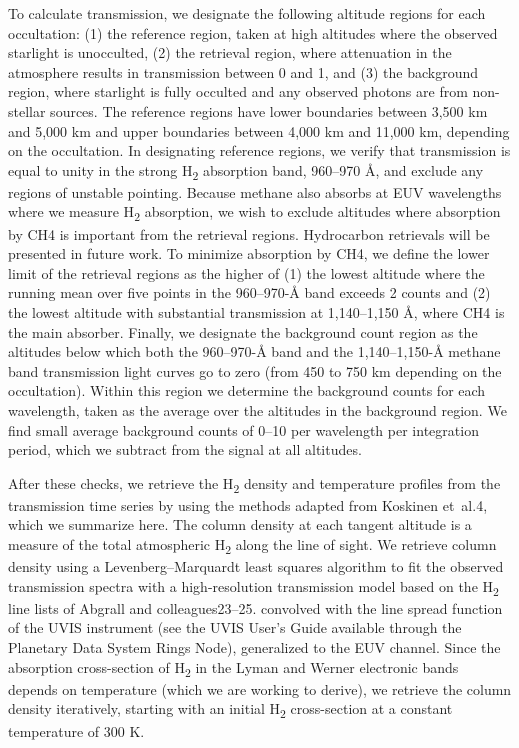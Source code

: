 To calculate transmission, we designate the following altitude regions for each occultation: (1) the reference region, taken at high altitudes where the observed starlight is unocculted, (2) the retrieval region, where attenuation in the atmosphere results in transmission between 0 and 1, and (3) the background region, where starlight is fully occulted and any observed photons are from non-stellar sources. The reference regions have lower boundaries between 3,500 km and 5,000 km and upper boundaries between 4,000 km and 11,000 km, depending on the occultation. In designating reference regions, we verify that transmission is equal to unity in the strong H\textsubscript{2} absorption band, 960–970 Å, and exclude any regions of unstable pointing. Because methane also absorbs at EUV wavelengths where we measure H\textsubscript{2} absorption, we wish to exclude altitudes where absorption by CH4 is important from the retrieval regions. Hydrocarbon retrievals will be presented in future work. To minimize absorption by CH4, we define the lower limit of the retrieval regions as the higher of (1) the lowest altitude where the running mean over five points in the 960–970-Å band exceeds 2 counts and (2) the lowest altitude with substantial transmission at 1,140–1,150 Å, where CH4 is the main absorber. Finally, we designate the background count region as the altitudes below which both the 960–970-Å band and the 1,140–1,150-Å methane band transmission light curves go to zero (from 450 to 750 km depending on the occultation). Within this region we determine the background counts for each wavelength, taken as the average over the altitudes in the background region. We find small average background counts of 0–10 per wavelength per integration period, which we subtract from the signal at all altitudes.

After these checks, we retrieve the H\textsubscript{2} density and temperature profiles from the transmission time series by using the methods adapted from Koskinen et al.4, which we summarize here. The column density at each tangent altitude is a measure of the total atmospheric H\textsubscript{2} along the line of sight. We retrieve column density using a Levenberg–Marquardt least squares algorithm to fit the observed transmission spectra with a high-resolution transmission model based on the H\textsubscript{2} line lists of Abgrall and colleagues23–25. convolved with the line spread function of the UVIS instrument (see the UVIS User’s Guide available through the Planetary Data System Rings Node), generalized to the EUV channel. Since the absorption cross-section of H\textsubscript{2} in the Lyman and Werner electronic bands depends on temperature (which we are working to derive), we retrieve the column density iteratively, starting with an initial H\textsubscript{2} cross-section at a constant temperature of 300 K.

